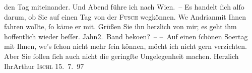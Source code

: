 \begin{ledgroupsized}[t]{13cm}
                    den Tag miteinander. Und Abend führe ich nach Wien. – Es handelt ſich alſo darum, ob Sie auf einen Tag von der \textsc{Fusch} wegkönnen. We{\geminationn}{ }Andrianmit Ihnen fahren wollte, ſo käme er mit. Grüßen Sie
                    ihn herzlich von mir; es geht ihm hoffentlich wieder beſſer.\pend
           \pstart
           Jahn2. Band beko{\geminationm}en? –\pend
           \pstart
           – Auf einen ſchönen So{\geminationm}ertag mit Ihnen, we{\geminationn}’s ſchon nicht mehr ſein können, möcht ich nicht
                    gern verzichten. Aber Sie ſollen ſich auch nicht die geringſte {\pb}Ungelegenheit machen.\pend
           \pstart Herzlich Ihr\spacefill\mbox{Arthur}\pend{}\pstart
           \textsc{Ischl}{ }15. 7. 97\pend
           \endnumbering{}\end{ledgroupsized}  \newcommand{\dateiname}{L00702}\newcommand{\titel}{Arthur Schnitzler an Hugo von Hofmannsthal, 15. 7. 1897}\newcommand{\editorInnen}{Martin Anton Müller und Gerd-Hermann Susen}
            \footnotesize
\begin{ledgroupsized}[t]{11.5cm}
\end{ledgroupsized}
         
      